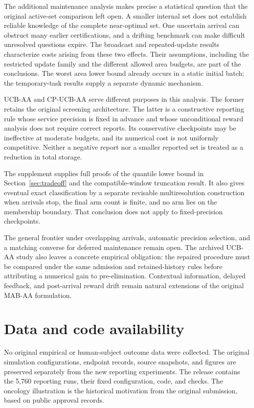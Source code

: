 \documentclass[11pt]{article}
\begin{document}
The additional maintenance analysis makes precise a statistical question
that the original active-set comparison left open. A smaller internal set
does not establish reliable knowledge of the complete near-optimal set.
One uncertain arrival can obstruct many earlier certifications, and a
drifting benchmark can make difficult unresolved questions expire. The
broadcast and repeated-update results characterize costs arising from these
two effects. Their assumptions, including the restricted update family and
the different allowed area budgets, are part of the conclusions. The worst
area lower bound already occurs in a static initial batch; the temporary-task
results supply a separate dynamic mechanism.

UCB-AA and CP-UCB-AA serve different purposes in this analysis. The former
retains the original screening architecture. The latter is a constructive
reporting rule whose service precision is fixed in advance and whose
unconditional reward analysis does not require correct reports. Its
conservative checkpoints may be ineffective at moderate budgets, and its
numerical cost is not uniformly competitive. Neither a negative report
nor a smaller reported set is treated as a reduction in total storage.

The supplement supplies full proofs of the quantile lower bound in
Section~\ref{sec:tradeoff} and the compatible-window truncation result. It also gives eventual exact
classification by a separate revisable multiresolution construction when
arrivals stop, the final arm count is finite, and no arm lies on the
membership boundary. That conclusion does not apply to fixed-precision
checkpoints.

The general frontier under overlapping arrivals, automatic precision
selection, and a matching converse for deferred maintenance remain open.
The archived UCB-AA study also leaves a concrete empirical obligation:
the repaired procedure must be compared under the same admission and
retained-history rules before attributing a numerical gain to pre-elimination.
Contextual information, delayed feedback, and post-arrival reward drift
remain natural extensions of the original MAB-AA formulation.

\section*{Data and code availability}
No original empirical or human-subject outcome data were collected.
The original simulation configurations, endpoint records, source snapshots,
and figures are preserved separately from the new reporting experiments.
The release contains the 5,760 reporting runs, their fixed configuration,
code, and checks. The oncology illustration is the historical motivation
from the original submission, based on public approval records.



\end{document}
